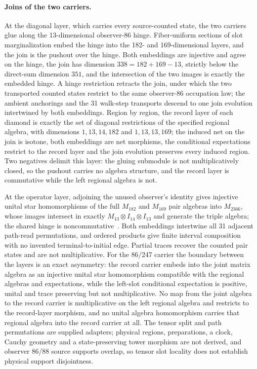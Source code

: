 \documentclass[11pt]{article}
\theoremstyle{remark}
\theoremstyle{plain}
\begin{document}
\paragraph{Joins of the two carriers.}
At the diagonal layer, which carries every source-counted state, the two
carriers glue along the 13-dimensional observer-86 hinge. Fiber-uniform
sections of slot marginalization embed the hinge into the 182- and
169-dimensional layers, and the join is the pushout over the hinge. Both
embeddings are injective and agree on the hinge, the join has dimension
\(338=182+169-13\), strictly below the direct-sum dimension \(351\), and the
intersection of the two images is exactly the embedded hinge. A hinge
restriction retracts the join, under which the two transported counted
states restrict to the same observer-86 occupation law; the ambient
anchorings and the 31 walk-step transports descend to one join evolution
intertwined by both embeddings. Region by region, the record layer of each
diamond is exactly the set of diagonal restrictions of the specified
regional algebra, with dimensions \(1,13,14,182\) and \(1,13,13,169\); the
induced net on the join is isotone, both embeddings are net morphisms, the
conditional expectations restrict to the record layer and the join
evolution preserves every induced region. Two negatives delimit this layer:
the gluing submodule is not multiplicatively closed, so the pushout carries
no algebra structure, and the record layer is commutative while the left
regional algebra is not.

At the operator layer, adjoining the unused observer's identity gives
injective unital star homomorphisms of the full \(M_{182}\) and \(M_{169}\)
pair algebras into \(M_{2366}\), whose images intersect in exactly
\(M_{13}\otimes I_{14}\otimes I_{13}\) and generate the triple algebra; the
shared hinge is noncommutative~\cite{ophObservers}. Both embeddings
intertwine all 31 adjacent path-read permutations, and ordered products
give finite interval composition with no invented terminal-to-initial edge.
Partial traces recover the counted pair states and are not multiplicative.
For the 86/247 carrier the boundary between the layers is an exact
asymmetry: the record carrier embeds into the joint matrix algebra as an
injective unital star homomorphism compatible with the regional algebras and
expectations, while the left-slot conditional expectation is positive,
unital and trace preserving but not multiplicative. No map from the joint
algebra to the record carrier is multiplicative on the left regional algebra
and restricts to the record-layer morphism, and no unital algebra
homomorphism carries that regional algebra into the record carrier at all.
The tensor split and path permutations are supplied adapters; physical
regions, preparations, a clock, Cauchy geometry and a state-preserving tower
morphism are not derived, and observer 86/88 source supports overlap, so
tensor slot locality does not establish physical support disjointness.
\end{document}
